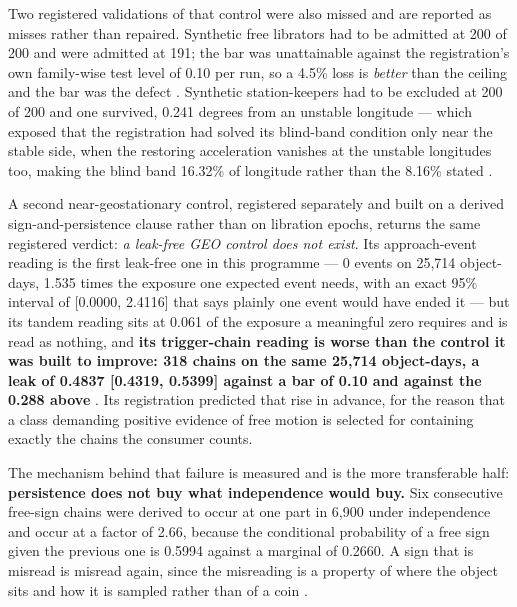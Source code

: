 \documentclass[11pt]{article}
\begin{document}

Two registered validations of that control were also missed and are reported as misses rather than repaired. Synthetic free librators had to be admitted at 200 of 200 and were admitted at 191; the bar was unattainable against the registration's own family-wise test level of 0.10 per run, so a 4.5\% loss is \emph{better} than the ceiling and the bar was the defect%
. Synthetic station-keepers had to be excluded at 200 of 200 and one survived, 0.241 degrees from an unstable longitude --- which exposed that the registration had solved its blind-band condition only near the stable side, when the restoring acceleration vanishes at the unstable longitudes too, making the blind band 16.32\% of longitude rather than the 8.16\% stated%
.

A second near-geostationary control, registered separately and built on a derived sign-and-persistence clause rather than on libration epochs, returns the same registered verdict: \emph{a leak-free GEO control does not exist}. Its approach-event reading is the first leak-free one in this programme --- 0 events on 25,714 object-days, 1.535 times the exposure one expected event needs, with an exact 95\% interval of [0.0000, 2.4116] that says plainly one event would have ended it --- but its tandem reading sits at 0.061 of the exposure a meaningful zero requires and is read as nothing, and \textbf{its trigger-chain reading is worse than the control it was built to improve: 318 chains on the same 25,714 object-days, a leak of 0.4837 [0.4319, 0.5399] against a bar of 0.10 and against the 0.288 above}%
. Its registration predicted that rise in advance, for the reason that a class demanding positive evidence of free motion is selected for containing exactly the chains the consumer counts.

The mechanism behind that failure is measured and is the more transferable half: \textbf{persistence does not buy what independence would buy.} Six consecutive free-sign chains were derived to occur at one part in 6,900 under independence and occur at a factor of 2.66, because the conditional probability of a free sign given the previous one is 0.5994 against a marginal of 0.2660. A sign that is misread is misread again, since the misreading is a property of where the object sits and how it is sampled rather than of a coin%
.
\end{document}
